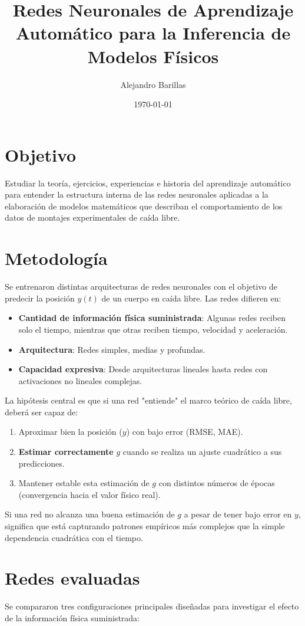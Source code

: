 \documentclass[11pt]{article}
\title{\textbf{Redes Neuronales de Aprendizaje Automático para
la Inferencia de Modelos Físicos}}
\author{Alejandro Barillas}
\date{\today}
\begin{document}
\maketitle

\section{Objetivo}
Estudiar la teoría, ejercicios, experiencias e historia del aprendizaje automático
para entender la estructura interna de las redes neuronales aplicadas a la 
elaboración de modelos matemáticos que describan el comportamiento de los datos
de montajes experimentales de caída libre.

\section{Metodología}
Se entrenaron distintas arquitecturas de redes neuronales con el objetivo de predecir la posición $y(t)$ de un cuerpo en caída libre. Las redes difieren en:
\begin{itemize}
    \item \textbf{Cantidad de información física suministrada}: Algunas redes reciben solo el tiempo, mientras que otras reciben tiempo, velocidad y aceleración.
    \item \textbf{Arquitectura}: Redes simples, medias y profundas.
    \item \textbf{Capacidad expresiva}: Desde arquitecturas lineales hasta redes con activaciones no lineales complejas.
\end{itemize}

La hipótesis central es que si una red "entiende" el marco teórico de caída libre, deberá ser capaz de:
\begin{enumerate}
    \item Aproximar bien la posición ($y$) con bajo error (RMSE, MAE).
    \item \textbf{Estimar correctamente} $g$ cuando se realiza un ajuste cuadrático a sus predicciones.
    \item Mantener estable esta estimación de $g$ con distintos números de épocas (convergencia hacia el valor físico real).
\end{enumerate}

Si una red no alcanza una buena estimación de $g$ a pesar de tener bajo error en $y$, significa que está capturando patrones empíricos más complejos que la simple dependencia cuadrática con el tiempo.

\section{Redes evaluadas}
Se compararon tres configuraciones principales diseñadas para investigar el efecto de la información física suministrada:
\end{document}
